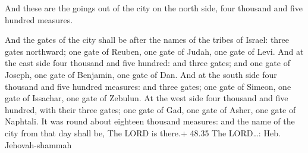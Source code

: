  And these are the goings out of the city on the north
side, four thousand and five hundred measures.

 And the gates of the city shall be after the names of
the tribes of Israel: three gates northward; one gate of Reuben, one
gate of Judah, one gate of Levi.  And at the east side
four thousand and five hundred: and three gates; and one gate of Joseph,
one gate of Benjamin, one gate of Dan.  And at the south
side four thousand and five hundred measures: and three gates; one gate
of Simeon, one gate of Issachar, one gate of Zebulun.  At
the west side four thousand and five hundred, with their three gates;
one gate of Gad, one gate of Asher, one gate of Naphtali.
 It was round about eighteen thousand measures: and the
name of the city from that day shall be, The LORD is there.+ 48.35 The
LORD\ldots: Heb. Jehovah-shammah
